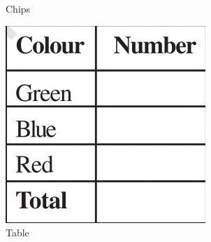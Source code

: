 \begin{enumerate}[label=\thesubsection.\arabic*, ref=\thesubsection.\theenumi,resume*]
\begin{figure}[H]
\begin{subfigure}{0.4\textwidth}
    \caption{Chips}
  \end{subfigure}
  \hfill
  \begin{subfigure}{0.4\textwidth}
    \includegraphics[width=\textwidth]{figs/percent3.jpg}
    \caption{Table}
  \end{subfigure}
  \caption{}
  \label{fig:percent2}
\end{figure}
\end{enumerate}
